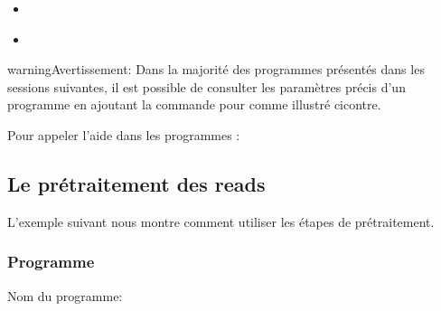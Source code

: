 \documentclass[letterpaper,10pt,french]{sphinxmanual}
\begin{document}
\begin{sphinxShadowBox}
\begin{itemize}
\begin{itemize}
\item {} 
\label{\detokenize{tutorial:id45}}{\hyperref[\detokenize{tutorial:creation-d-une-base-de-donnees-avec-la-suite-blast}]{}}

\item {} 
\label{\detokenize{tutorial:id46}}{\hyperref[\detokenize{tutorial:classification-des-reads-avec-la-suite-blast}]{}}

\end{itemize}

\end{itemize}
\end{sphinxShadowBox}
\label{\detokenize{tutorial:pre-processing}}
\begin{sphinxadmonition}{warning}{Avertissement:}
Dans la majorité des programmes présentés dans les sessions suivantes, il est possible de consulter les paramètres précis d’un programme en ajoutant la commande  pour  comme illustré ci\sphinxhyphen{}contre.
\end{sphinxadmonition}

Pour appeler l’aide dans les programmes :

\begin{sphinxVerbatim}[commandchars=\\\{\}]
 
\end{sphinxVerbatim}


\subsection{Le prétraitement des reads}
\label{\detokenize{tutorial:le-pretraitement-des-reads}}
L’exemple suivant nous montre comment utiliser les étapes de prétraitement.


\subsubsection{Programme}
\label{\detokenize{tutorial:programme}}
Nom du programme:

\begin{sphinxVerbatim}[commandchars=\\\{\}]
\end{sphinxVerbatim}
\end{document}
